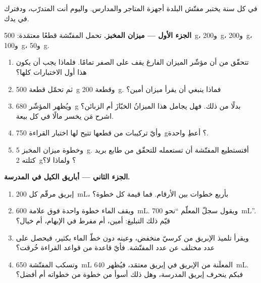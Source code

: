 \begin{problem}\label{pb:g6:measurement-in-science:1}
في كل سنة يختبر مفتّش البلدة أجهزة المتاجر والمدارس. واليوم أنت
المتدرّب، ودفترك في يدك.

\medskip\noindent\textbf{الجزء الأول --- ميزان المخبز.}
تحمل المفتّشة قطعًا معتمَدة: \qty{500}{g}،
و\qty{200}{g}، و\qty{200}{g}، و\qty{100}{g}، و\qty{50}{g}.
\begin{enumerate}
  \item تتحقّق من أن مؤشّر الميزان الفارغ يقف على الصفر تمامًا.
        فلماذا يجب أن يكون هذا أول الاختبارات كلها؟
  \item ثم تحمّل قطعة \qty{500}{g} وقطعة \qty{200}{g}. فماذا
        ينبغي أن يقرأ ميزان أمين؟
  \item ويُظهر المؤشّر \qty{680}{g} بدلًا من ذلك. فهل يجامل هذا
        الميزانُ الخبّازَ أم الزبائن؟ اشرح مَن يخسر مالًا في كل
        بيعة.
  \item وأيّ تركيبات من قطعها تتيح لها اختبار القراءة
        \qty{750}{g}؟ أعطِ واحدة.
  \item وخطوة ميزان المخبز \qty{5}{g}. أفتستطيع المفتّشة أن
        تستعمله للتحقّق من طابع بريد كتلته \qty{2}{g}؟
        ولماذا لا؟
\end{enumerate}

\medskip\noindent\textbf{الجزء الثاني --- أباريق الكيل في
المدرسة.}
\begin{enumerate}[resume]
  \item إبريق مرقّم كل \qty{200}{mL}، بأربع خطوات بين الأرقام.
        فما قيمة كل خطوة؟
  \item ويقف الماء خطوة واحدة فوق علامة \qty{600}{mL}. ويقول
        سجلّ المعلّم ``نحو \qty{700}{mL}''. قيّم ذلك التبليغ:
        أمين، أم مفرط في الإبهام، أم خيال؟
  \item ويقرأ تلميذ الإبريق من كرسيّ منخفض، وعينه دون خطّ الماء
        بكثير، فيحصل على عدد مختلف عن عدد المفتّشة. فأيّ قاعدة
        من قواعد القراءة خُرقت؟
  \item وتسكب المفتّشة \qty{650}{mL} المعلَنة من الإبريق في
        إبريق معتمَد، فيُظهر \qty{640}{mL}. فبكم ينحرف إبريق
        المدرسة، وهل ذلك أسوأ من خطوة من خطواته أم أفضل؟
\end{enumerate}


\end{problem}
